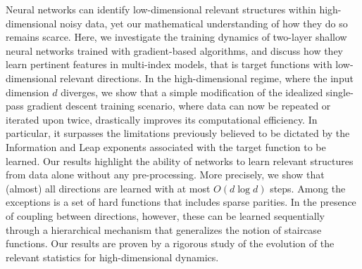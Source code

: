 Neural networks can identify low-dimensional relevant structures within high-dimensional noisy data, yet our mathematical understanding of how they do so remains scarce. Here, we investigate the training dynamics of two-layer shallow neural networks trained with gradient-based algorithms, and discuss how they learn pertinent features in multi-index models, that is target functions with low-dimensional relevant directions. In the high-dimensional regime, where the input dimension $d$ diverges, we show that a simple modification of the idealized single-pass gradient descent training scenario, where data can now be repeated or iterated upon twice, drastically improves its computational efficiency. In particular, it surpasses the limitations previously believed to be dictated by the Information and Leap exponents associated with the target function to be learned. Our results highlight the ability of networks to learn relevant structures from data alone without any pre-processing. More precisely, we show that (almost) all directions are learned with at most $O(d \log d)$ steps. Among the exceptions is a set of hard functions that includes sparse parities. In the presence of coupling between directions, however, these can be learned sequentially through a hierarchical mechanism that generalizes the notion of staircase functions. Our results are proven by a rigorous study of the evolution of the relevant statistics for high-dimensional dynamics.
